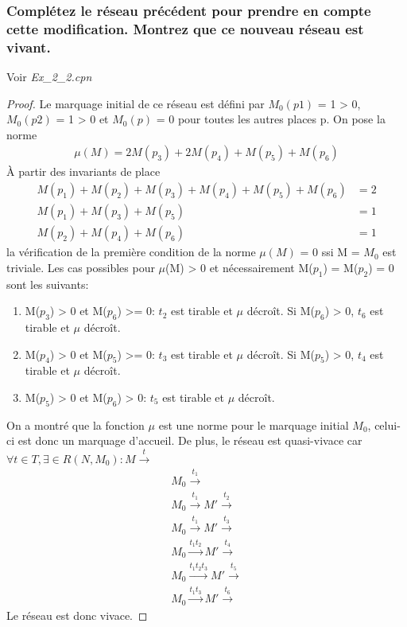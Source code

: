 \documentclass[french]{article}
\begin{document}
\subsubsection{Complétez le réseau précédent pour prendre en compte cette modification. Montrez que ce nouveau réseau est 
vivant.}
Voir \textit{Ex\_2\_2.cpn}
\begin{proof}
Le marquage initial de ce réseau est défini par $M_0(p1)$ = 1 > 0, $M_0(p2)$ = 1 > 0 et $M_0(p)$ = 0 pour toutes les autres 
places p. On pose la norme
\begin{align*}
\mu(M) = 2M(p_3) + 2M(p_4) + M(p_5) + M(p_6)
\end{align*}
À partir des invariants de place
\begin{align*}
M(p_1) + M(p_2) + M(p_3) + M(p_4) + M(p_5) + M(p_6) &= 2 \\
M(p_1) + M(p_3) + M(p_5) &= 1 \\
M(p_2) + M(p_4) + M(p_6) &= 1
\end{align*}
la vérification de la première condition de la norme $\mu(M)$ = 0 ssi M = $M_0$ est triviale. Les cas possibles pour 
$\mu$(M) > 0 et nécessairement M($p_1$) = M($p_2$) = 0 sont les 
suivants:
\begin{enumerate}
\item M($p_3$) > 0 et M($p_6$) >= 0: $t_2$ est tirable et $\mu$ décroît. Si M($p_6$) > 0, $t_6$ est tirable et $\mu$ décroît.
\item M($p_4$) > 0 et M($p_5$) >= 0: $t_3$ est tirable et $\mu$ décroît. Si M($p_5$) > 0, $t_4$ est tirable et $\mu$ décroît.
\item M($p_5$) > 0 et M($p_6$) > 0: $t_5$ est tirable et $\mu$ décroît. 	
\end{enumerate}
On a montré que la fonction $\mu$ est une norme pour le marquage initial $M_0$, celui-ci est donc un marquage d'accueil. De 
plus, le réseau est quasi-vivace car $\forall t \in T, \exists \in R(N, M_0): M \xrightarrow{t}$
\begin{align*}
M_0 \xrightarrow{t_1} \\
M_0 \xrightarrow{t_1} M' \xrightarrow{t_2} \\
M_0 \xrightarrow{t_1} M' \xrightarrow{t_3} \\ 
M_0 \xrightarrow{t_1 t_2} M' \xrightarrow{t_4} \\ 
M_0 \xrightarrow{t_1 t_2 t_3} M' \xrightarrow{t_5} \\ 
M_0 \xrightarrow{t_1 t_3} M' \xrightarrow{t_6} 
\end{align*}
Le réseau est donc vivace.
\end{proof}
\end{document}
